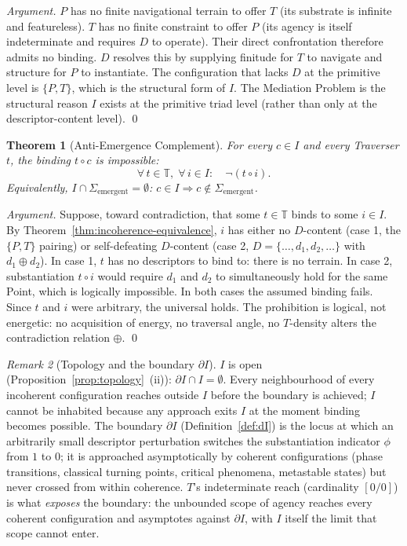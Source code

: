 \documentclass[11pt,a4paper]{article}
\newtheorem{theorem}{Theorem}[section]
\theoremstyle{definition}
\theoremstyle{remark}
\newtheorem{remark}[theorem]{Remark}
\begin{document}
\begin{proof}[Argument]
$P$ has no finite navigational terrain to offer $T$ (its substrate is infinite and featureless). $T$ has no finite constraint to offer $P$ (its agency is itself indeterminate and requires $D$ to operate). Their direct confrontation therefore admits no binding. $D$ resolves this by supplying finitude for $T$ to navigate and structure for $P$ to instantiate. The configuration that lacks $D$ at the primitive level is $\{P,T\}$, which is the structural form of $I$. The Mediation Problem is the structural reason $I$ exists at the primitive triad level (rather than only at the descriptor-content level). \qed
\end{proof}

\begin{theorem}[Anti-Emergence Complement]\label{thm:antiemergence-complement}
For every $c \in I$ and every Traverser $t$, the binding $t \circ c$ is impossible:
\[
\forall\, t \in \mathbb{T},\;\forall\, i \in I :\quad \neg(t \circ i).
\]
Equivalently, $I \cap \Sigma_{\mathrm{emergent}} = \emptyset$: $c \in I \Rightarrow c \notin \Sigma_{\mathrm{emergent}}$.
\end{theorem}

\begin{proof}[Argument]
Suppose, toward contradiction, that some $t \in \mathbb{T}$ binds to some $i \in I$. By Theorem~\ref{thm:incoherence-equivalence}, $i$ has either no $D$-content (case 1, the $\{P,T\}$ pairing) or self-defeating $D$-content (case 2, $D = \{\ldots, d_{1}, d_{2}, \ldots\}$ with $d_{1} \oplus d_{2}$). In case 1, $t$ has no descriptors to bind to: there is no terrain. In case 2, substantiation $t \circ i$ would require $d_{1}$ and $d_{2}$ to simultaneously hold for the same Point, which is logically impossible. In both cases the assumed binding fails. Since $t$ and $i$ were arbitrary, the universal holds. The prohibition is logical, not energetic: no acquisition of energy, no traversal angle, no $T$-density alters the contradiction relation $\oplus$. \qed
\end{proof}

\begin{remark}[Topology and the boundary $\partial I$]\label{rem:I-topology}
$I$ is open (Proposition~\ref{prop:topology}~(ii)): $\partial I \cap I = \emptyset$. Every neighbourhood of every incoherent configuration reaches outside $I$ before the boundary is achieved; $I$ cannot be inhabited because any approach exits $I$ at the moment binding becomes possible. The boundary $\partial I$ (Definition~\ref{def:dI}) is the locus at which an arbitrarily small descriptor perturbation switches the substantiation indicator $\phi$ from $1$ to $0$; it is approached asymptotically by coherent configurations (phase transitions, classical turning points, critical phenomena, metastable states) but never crossed from within coherence. $T$'s indeterminate reach (cardinality $[0/0]$) is what \emph{exposes} the boundary: the unbounded scope of agency reaches every coherent configuration and asymptotes against $\partial I$, with $I$ itself the limit that scope cannot enter.
\end{remark}
\end{document}
